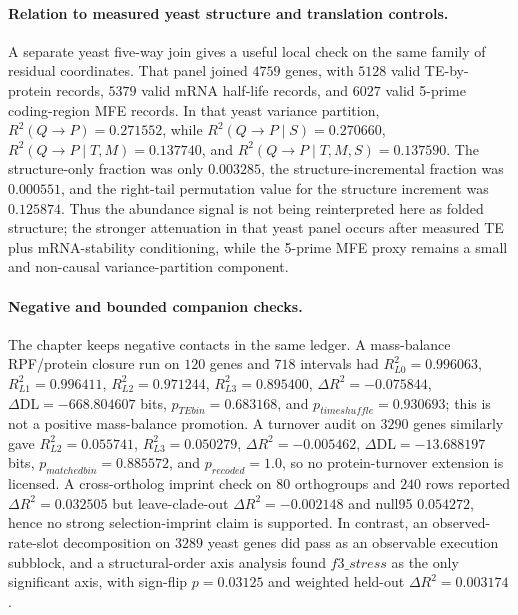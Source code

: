 \paragraph{Relation to measured yeast structure and translation controls.}
A separate yeast five-way join gives a useful local check on the same family of residual coordinates.  That panel joined $4759$ genes, with $5128$ valid TE-by-protein records, $5379$ valid mRNA half-life records, and $6027$ valid 5-prime coding-region MFE records.  In that yeast variance partition, $R^2(Q\to P)=0.271552$, while $R^2(Q\to P\mid S)=0.270660$, $R^2(Q\to P\mid T,M)=0.137740$, and $R^2(Q\to P\mid T,M,S)=0.137590$.  The structure-only fraction was only $0.003285$, the structure-incremental fraction was $0.000551$, and the right-tail permutation value for the structure increment was $0.125874$.  Thus the abundance signal is not being reinterpreted here as folded structure; the stronger attenuation in that yeast panel occurs after measured TE plus mRNA-stability conditioning, while the 5-prime MFE proxy remains a small and non-causal variance-partition component.

\paragraph{Negative and bounded companion checks.}
The chapter keeps negative contacts in the same ledger.  A mass-balance RPF/protein closure run on $120$ genes and $718$ intervals had $R^2_{L0}=0.996063$, $R^2_{L1}=0.996411$, $R^2_{L2}=0.971244$, $R^2_{L3}=0.895400$, $\Delta R^2=-0.075844$, $\Delta\mathrm{DL}=-668.804607$ bits, $p_{TEbin}=0.683168$, and $p_{timeshuffle}=0.930693$; this is not a positive mass-balance promotion.  A turnover audit on $3290$ genes similarly gave $R^2_{L2}=0.055741$, $R^2_{L3}=0.050279$, $\Delta R^2=-0.005462$, $\Delta\mathrm{DL}=-13.688197$ bits, $p_{matchedbin}=0.885572$, and $p_{recoded}=1.0$, so no protein-turnover extension is licensed.  A cross-ortholog imprint check on $80$ orthogroups and $240$ rows reported $\Delta R^2=0.032505$ but leave-clade-out $\Delta R^2=-0.002148$ and null95 $0.054272$, hence no strong selection-imprint claim is supported.  In contrast, an observed-rate-slot decomposition on $3289$ yeast genes did pass as an observable execution subblock, and a structural-order axis analysis found $f3\_stress$ as the only significant axis, with sign-flip $p=0.03125$ and weighted held-out $\Delta R^2=0.003174$.

